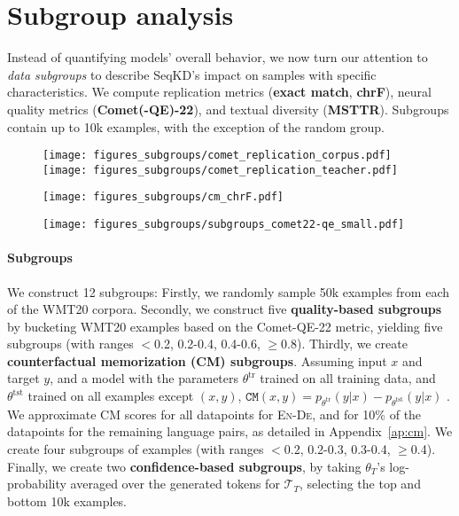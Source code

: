 \section{Subgroup analysis}
\label{sec:subgroup_analysis}

Instead of quantifying models' overall behavior, we now turn our attention to \textit{data subgroups} to describe SeqKD's impact on samples with specific characteristics.
We compute replication metrics (\textbf{exact match}, \textbf{chrF}), neural quality metrics (\textbf{Comet(-QE)-22}), and textual diversity (\textbf{MSTTR}).
Subgroups contain up to 10k examples, with the exception of the random group.

\begin{figure}[t]\centering
	\begin{minipage}{0.6\columnwidth}\centering
		\texttt{[image: figures\_subgroups/comet\_replication\_corpus.pdf]}\texttt{[image: figures\_subgroups/comet\_replication\_teacher.pdf]}
	\label{fig:replication_cqe}
	\end{minipage}
	\begin{minipage}{0.37\columnwidth}\centering
		\texttt{[image: figures\_subgroups/cm\_chrF.pdf]}
	\label{fig:chrf_cm}
	\end{minipage}
	\vspace{0.2cm}

	\begin{minipage}{\columnwidth}
	\centering
		\texttt{[image: figures\_subgroups/subgroups\_comet22-qe\_small.pdf]}
	\label{fig:subgroups}
	\end{minipage}
\end{figure}

\paragraph{Subgroups} We construct 12 subgroups: Firstly, we randomly sample 50k examples from each of the WMT20 corpora.
Secondly, we construct five \textbf{quality-based subgroups} by bucketing WMT20 examples based on the Comet-QE-22 metric, yielding five subgroups (with ranges ${<}$0.2, 0.2-0.4, 0.4-0.6, ${\geq}$0.8).
Thirdly, we create \textbf{counterfactual memorization (CM) subgroups}. Assuming input $x$ and target $y$, and a model with the parameters $\theta^{\text{tr}}$ trained on all training data, and $\theta^{\text{tst}}$ trained on all examples except $(x,y)$, $\texttt{CM}(x, y) {=} p_{\theta^{\text{tr}}}(y|x) - p_{\theta^{\text{tst}}}(y|x)$ \citep{feldman2020does,feldman2020what}.
We approximate CM scores for all datapoints for \textsc{En}-\textsc{De}, and for 10\% of the datapoints for the remaining language pairs, as detailed in Appendix~\ref{ap:cm}.
We create four subgroups of examples (with ranges ${<}$0.2, 0.2-0.3, 0.3-0.4, ${\geq}$0.4).
Finally, we create two \textbf{confidence-based subgroups}, by taking $\theta_T$'s log-probability averaged over the generated tokens for $\mathcal{T}_T$, selecting the top and bottom 10k examples.

